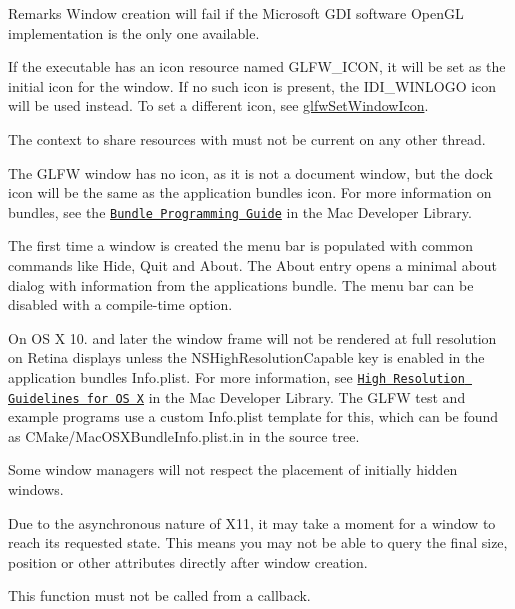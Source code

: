 \begin{DoxyRemark}{Remarks}
Window creation will fail if the Microsoft G\+DI software Open\+GL implementation is the only one available.

If the executable has an icon resource named {\ttfamily G\+L\+F\+W\+\_\+\+I\+C\+ON,} it will be set as the initial icon for the window. If no such icon is present, the {\ttfamily I\+D\+I\+\_\+\+W\+I\+N\+L\+O\+GO} icon will be used instead. To set a different icon, see \hyperlink{group__window_ga182987a1a62a41a924842b9473d560df}{glfw\+Set\+Window\+Icon}.

The context to share resources with must not be current on any other thread.

The G\+L\+FW window has no icon, as it is not a document window, but the dock icon will be the same as the application bundle\textquotesingle{}s icon. For more information on bundles, see the \href{https://developer.apple.com/library/mac/documentation/CoreFoundation/Conceptual/CFBundles/}{\tt Bundle Programming Guide} in the Mac Developer Library.

The first time a window is created the menu bar is populated with common commands like Hide, Quit and About. The About entry opens a minimal about dialog with information from the application\textquotesingle{}s bundle. The menu bar can be disabled with a compile-\/time option.

On OS X 10. and later the window frame will not be rendered at full resolution on Retina displays unless the {\ttfamily N\+S\+High\+Resolution\+Capable} key is enabled in the application bundle\textquotesingle{}s {\ttfamily Info.\+plist}. For more information, see \href{https://developer.apple.com/library/mac/documentation/GraphicsAnimation/Conceptual/HighResolutionOSX/Explained/Explained.html}{\tt High Resolution Guidelines for OS X} in the Mac Developer Library. The G\+L\+FW test and example programs use a custom {\ttfamily Info.\+plist} template for this, which can be found as {\ttfamily C\+Make/\+Mac\+O\+S\+X\+Bundle\+Info.\+plist.\+in} in the source tree.

Some window managers will not respect the placement of initially hidden windows.

Due to the asynchronous nature of X11, it may take a moment for a window to reach its requested state. This means you may not be able to query the final size, position or other attributes directly after window creation.
\end{DoxyRemark}
This function must not be called from a callback.


